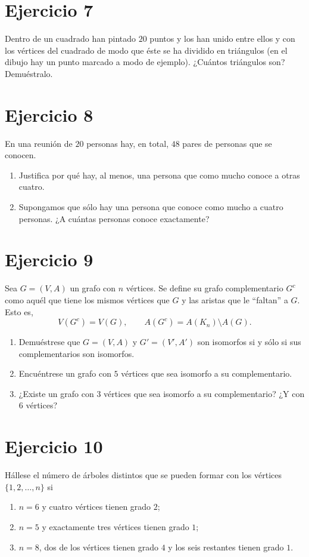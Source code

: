 \documentclass[12pt]{article}
\begin{document}
\section*{Ejercicio 7}
Dentro de un cuadrado han pintado $20$ puntos y los han unido entre ellos y con los vértices del cuadrado de modo que éste se ha dividido en triángulos (en el dibujo hay un punto marcado a modo de ejemplo). ¿Cuántos triángulos son? Demuéstralo.

\section*{Ejercicio 8}
En una reunión de $20$ personas hay, en total, $48$ pares de personas que se conocen.
\begin{enumerate}
    \item Justifica por qué hay, al menos, una persona que como mucho conoce a otras cuatro.
    \item Supongamos que sólo hay una persona que conoce como mucho a cuatro personas. ¿A cuántas personas conoce exactamente?
\end{enumerate}

\section*{Ejercicio 9}
Sea $G=(V,A)$ un grafo con $n$ vértices. Se define su grafo complementario $G^c$ como aquél que tiene los mismos vértices que $G$ y las aristas que le ``faltan'' a $G$. Esto es,
\[
V(G^c)=V(G), \qquad A(G^c)=A(K_n)\setminus A(G).
\]
\begin{enumerate}
    \item Demuéstrese que $G=(V,A)$ y $G'=(V',A')$ son isomorfos si y sólo si sus complementarios son isomorfos.
    \item Encuéntrese un grafo con $5$ vértices que sea isomorfo a su complementario.
    \item ¿Existe un grafo con $3$ vértices que sea isomorfo a su complementario? ¿Y con $6$ vértices?
\end{enumerate}

\section*{Ejercicio 10}
Hállese el número de árboles distintos que se pueden formar con los vértices $\{1,2,\dots,n\}$ si
\begin{enumerate}
    \item $n=6$ y cuatro vértices tienen grado $2$;
    \item $n=5$ y exactamente tres vértices tienen grado $1$;
    \item $n=8$, dos de los vértices tienen grado $4$ y los seis restantes tienen grado $1$.
\end{enumerate}
\end{document}
